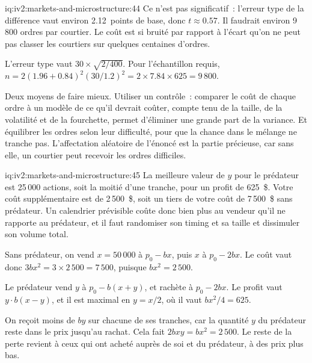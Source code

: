 \begin{solution}{iq:iv2:markets-and-microstructure:44}
Ce n'est pas significatif~: l'erreur type de la différence vaut environ 2.12~points de base, donc $t \approx 0.57$. Il faudrait environ 9\,800 ordres par courtier. Le coût est si bruité par rapport à l'écart qu'on ne peut pas classer les courtiers sur quelques centaines d'ordres.

L'erreur type vaut $30 \times \sqrt{2/400}$. Pour l'échantillon requis, $n = 2(1.96 + 0.84)^2(30/1.2)^2 = 2 \times 7.84 \times 625 = 9\,800$.

Deux moyens de faire mieux. Utiliser un contrôle~: comparer le coût de chaque ordre à un modèle de ce qu'il devrait coûter, compte tenu de la taille, de la volatilité et de la fourchette, permet d'éliminer une grande part de la variance. Et équilibrer les ordres selon leur difficulté, pour que la chance dans le mélange ne tranche pas. L'affectation aléatoire de l'énoncé est la partie précieuse, car sans elle, un courtier peut recevoir les ordres difficiles.

\end{solution}

\begin{solution}{iq:iv2:markets-and-microstructure:45}
La meilleure valeur de $y$ pour le prédateur est 25\,000 actions, soit la moitié d'une tranche, pour un profit de 625~\$. Votre coût supplémentaire est de 2\,500~\$, soit un tiers de votre coût de 7\,500~\$ sans prédateur. Un calendrier prévisible coûte donc bien plus au vendeur qu'il ne rapporte au prédateur, et il faut randomiser son timing et sa taille et dissimuler son volume total.

Sans prédateur, on vend $x = 50\,000$ à $p_0 - bx$, puis $x$ à $p_0 - 2bx$. Le coût vaut donc $3bx^2 = 3 \times 2\,500 = 7\,500$, puisque $bx^2 = 2\,500$.

Le prédateur vend $y$ à $p_0 - b(x + y)$, et rachète à $p_0 - 2bx$. Le profit vaut $y \cdot b(x - y)$, et il est maximal en $y = x/2$, où il vaut $bx^2/4 = 625$.

On reçoit moins de $by$ sur chacune de ses tranches, car la quantité $y$ du prédateur reste dans le prix jusqu'au rachat. Cela fait $2bxy = bx^2 = 2\,500$. Le reste de la perte revient à ceux qui ont acheté auprès de soi et du prédateur, à des prix plus bas.

\end{solution}

